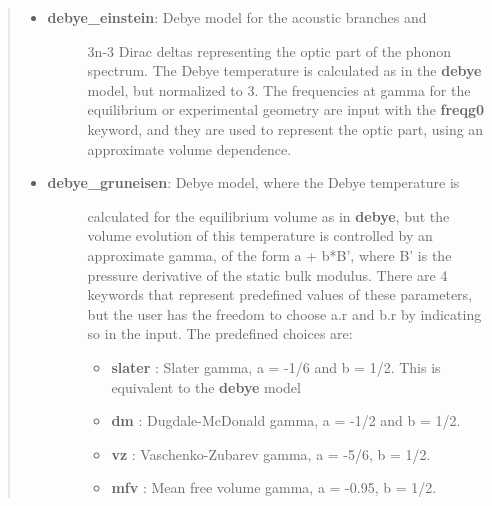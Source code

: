 \documentclass[a4paper]{article}
\begin{document}
\begin{itemize}
\begin{quote}
\begin{itemize}
\begin{description}
\end{description}

\item 
\begin{description}
\item[{\textbf{debye\_einstein}: Debye model for the acoustic branches and}] \leavevmode 
3n-3 Dirac deltas representing the optic part of the phonon
spectrum. The Debye temperature is calculated as in the
\textbf{debye} model, but normalized to 3. The frequencies at gamma
for the equilibrium or experimental geometry are input with the
\textbf{freqg0} keyword, and they are used to represent the optic
part, using an approximate volume dependence.

\end{description}

\item 
\begin{description}
\item[{\textbf{debye\_gruneisen}: Debye model, where the Debye temperature is}] \leavevmode 
calculated for the equilibrium volume as in \textbf{debye}, but the
volume evolution of this temperature is controlled by an
approximate gamma, of the form a + b*B', where B' is the
pressure derivative of the static bulk modulus. There are 4
keywords that represent predefined values of these parameters,
but the user has the freedom to choose a.r and b.r by
indicating so in the input. The predefined choices are:

\begin{itemize}
\item \textbf{slater} : Slater gamma, a = -1/6 and b = 1/2. This is
equivalent to the \textbf{debye} model

\item \textbf{dm} : Dugdale-McDonald gamma, a = -1/2 and b = 1/2.

\item \textbf{vz} : Vaschenko-Zubarev gamma, a = -5/6, b = 1/2.

\item \textbf{mfv} : Mean free volume gamma, a = -0.95, b = 1/2.
\end{itemize}

\end{description}


\end{itemize}
\end{quote}
\end{itemize}
\end{document}
